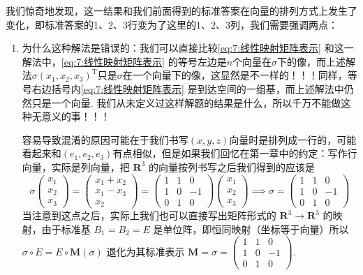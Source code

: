 我们惊奇地发现，这一结果和我们前面得到的标准答案在向量的排列方式上发生了变化，即标准答案的1、2、3行变为了这里的1、2、3列，我们需要强调两点：
\begin{enumerate}
    \item 为什么这种解法是错误的：我们可以直接比较\autoref{eq:7:线性映射矩阵表示} 和这一解法中，\autoref*{eq:7:线性映射矩阵表示} 的等号左边是$n$个向量在$\sigma$下的像，而上述解法$\sigma(x_1,x_2,x_3)^{\mathrm{T}}$只是$\sigma$在一个向量下的像，这显然是不一样的！！！同样，等号右边括号内\autoref*{eq:7:线性映射矩阵表示} 是到达空间的一组基，而上述解法中仍然只是一个向量. 我们从未定义过这样解题的结果是什么，所以千万不能做这种无意义的事！！！

          容易导致混淆的原因可能在于我们书写$(x,y,z)$向量时是排列成一行的，可能看起来和$(e_1,e_2,e_3)$有点相似，但是如果我们回忆在第一章中的约定：写作行向量，实际是列向量，把 $\mathbf{R}^3$ 的向量按列书写之后我们得到的应该是
          \[
            \sigma\begin{pmatrix}
                x_1 \\ x_2 \\ x_3
            \end{pmatrix} = \begin{pmatrix}
                x_1 + x_2 \\ x_1 - x_3 \\ x_2
            \end{pmatrix} = \begin{pmatrix}
                1 & 1 & 0 \\ 1 & 0 & -1 \\  0 & 1 & 0
            \end{pmatrix} \begin{pmatrix}
                x_1 \\ x_2 \\ x_3
            \end{pmatrix} \implies
            \sigma = \begin{pmatrix}
                1 & 1 & 0 \\ 1 & 0 & -1 \\  0 & 1 & 0
            \end{pmatrix}
          \]
          当注意到这点之后，实际上我们也可以直接写出矩阵形式的 $\mathbf{R}^3 \to \mathbf{R}^3$ 的映射，由于标准基 $B_1 = B_2 = E$ 是单位阵，即恒同映射（坐标等于向量）所以 $\sigma\circ E = E\circ \mathbf{M}(\sigma)$ 退化为其标准表示 $\mathbf{M} = \sigma = \begin{pmatrix}
              1 & 1 & 0 \\ 1 & 0 & -1 \\  0 & 1 & 0
          \end{pmatrix}$.


\end{enumerate}
